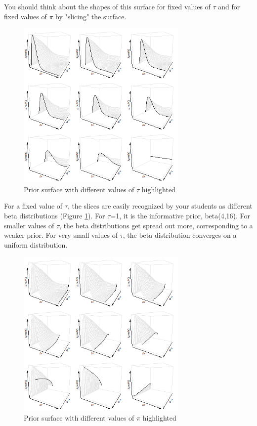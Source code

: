 \documentclass[12pt]{article}
\begin{document}
You should think about the shapes of this surface for fixed values of $\tau$ and for fixed values of $\pi$ by "slicing" the surface.

\begin{figure}
\begin{center}
\includegraphics[width=3.25in]{fig4.png}
\end{center}
\caption{Prior surface with different values of $\tau$ highlighted \label{fig:hedging_surface1}}
\end{figure}

For a fixed value of $\tau$, the slices are easily recognized by your students as different beta distributions (Figure \ref{fig:hedging_surface1}). For $\tau$=1, it is the informative prior, beta(4,16). For smaller values of $\tau$, the beta distributions get spread out more, corresponding to a weaker prior. For very small values of $\tau$, the beta distribution converges on a uniform distribution.

\begin{figure}
\begin{center}
\includegraphics[width=3.25in]{fig5.png}
\end{center}
\caption{Prior surface with different values of $\pi$ highlighted \label{fig:hedging_surface2}}
\end{figure}
\end{document}
